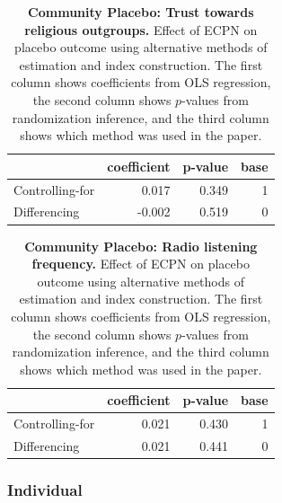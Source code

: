 \documentclass[
]{article}
\begin{document}
\begin{table}[H]
\begin{center}
\label{tab:pl_out_tab}
\caption{\textbf{Community Placebo: Trust towards religious outgroups.} Effect of ECPN on placebo outcome using alternative methods of estimation and index construction. The first column shows coefficients from OLS regression, the second column shows $p$-values from randomization inference, and the third column shows which method was used in the paper.}
\smallskip

\begin{tabular}{l|r|r|r}
\hline
  & coefficient & p-value & base\\
\hline
Controlling-for & 0.017 & 0.349 & 1\\
\hline
Differencing & -0.002 & 0.519 & 0\\
\hline
\end{tabular}


\end{center}
\end{table}

\begin{table}[H]
\begin{center}
\label{tab:pl_rad_tab}
\caption{\textbf{Community Placebo: Radio listening frequency.} Effect of ECPN on placebo outcome using alternative methods of estimation and index construction. The first column shows coefficients from OLS regression, the second column shows $p$-values from randomization inference, and the third column shows which method was used in the paper.}
\smallskip

\begin{tabular}{l|r|r|r}
\hline
  & coefficient & p-value & base\\
\hline
Controlling-for & 0.021 & 0.430 & 1\\
\hline
Differencing & 0.021 & 0.441 & 0\\
\hline
\end{tabular}


\end{center}
\end{table}

\hypertarget{individual}{%
\subsubsection{Individual}\label{individual}}
\end{document}
